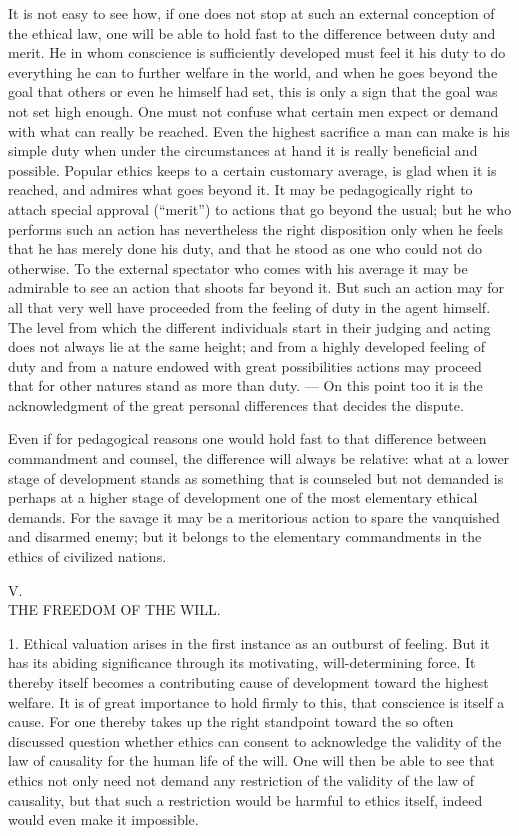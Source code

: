 \documentclass[12pt,a4paper,openany]{book}
\newcommand{\opage}[1]{\marginnote{\footnotesize\textit{[#1]}}}
\newcounter{etikch}
\newcommand{\chapterhead}[2]{\stepcounter{etikch}\bigskip\begin{center}\pdfbookmark[1]{#1 #2}{etikch.\arabic{etikch}}#1\\[3pt]{\large #2}\end{center}\medskip}
\begin{document}
It is not easy to see how, if one does not stop at such an external conception of the ethical law, one
will be able to hold fast to the difference between duty and merit. He in whom conscience is sufficiently
developed must feel it his duty to do everything he can to further welfare in the world, and when he goes
beyond the goal that others or even he himself had set, this is only a sign that the goal was not set
high enough. One must not confuse what certain men expect or demand with what can really be reached. Even
the highest sacrifice a
\opage{106}man can make is his simple duty when under the circumstances at hand it is really beneficial and
possible. Popular ethics keeps to a certain customary average, is glad when it is reached, and admires
what goes beyond it. It may be pedagogically right to attach special approval (``merit'') to actions
that go beyond the usual; but he who performs such an action has nevertheless the right disposition only
when he feels that he has merely done his duty, and that he stood as one who could not do otherwise. To
the external spectator who comes with his average it may be admirable to see an action that shoots far
beyond it. But such an action may for all that very well have proceeded from the feeling of duty in the
agent himself. The level from which the different individuals start in their judging and acting does not
always lie at the same height; and from a highly developed feeling of duty and from a nature endowed with
great possibilities actions may proceed that for other natures stand as more than duty. --- On this point
too it is the acknowledgment of the great personal differences that decides the dispute.

Even if for pedagogical reasons one would hold fast to that difference between commandment and counsel,
the difference will always be relative: what at a lower stage of development stands as something that is
counseled but not demanded is perhaps at a higher stage of development one of the most elementary ethical
demands. For the savage it may be a meritorious action to spare the vanquished and disarmed enemy; but it
belongs to the elementary commandments in the ethics of civilized nations.

\chapterhead{V.}{THE FREEDOM OF THE WILL.}

1. Ethical valuation arises in the first instance as an outburst of feeling. But it has its abiding
significance through its
\opage{107}motivating, will-determining force. It thereby itself becomes a contributing cause of development
toward the highest welfare. It is of great importance to hold firmly to this, that conscience is itself
a cause. For one thereby takes up the right standpoint toward the so often discussed question whether
ethics can consent to acknowledge the validity of the law of causality for the human life of the will.
One will then be able to see that ethics not only need not demand any restriction of the validity of
the law of causality, but that such a restriction would be harmful to ethics itself, indeed would even
make it impossible.
\end{document}
